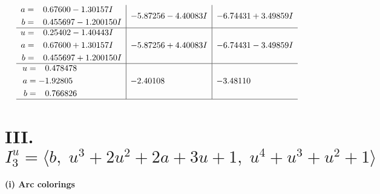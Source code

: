 \documentclass[1p]{elsarticle_modified}
\theoremstyle{definition}
\begin{document}
$$\begin{array}{c|c|c}
\begin{aligned}
a &= \phantom{-}0.67600 - 1.30157 I \\
b &= \phantom{-}0.455697 - 1.200150 I\end{aligned}
 & -5.87256 - 4.40083 I & -6.74431 + 3.49859 I \\ \hline\begin{aligned}
u &= \phantom{-}0.25402 - 1.40443 I \\
a &= \phantom{-}0.67600 + 1.30157 I \\
b &= \phantom{-}0.455697 + 1.200150 I\end{aligned}
 & -5.87256 + 4.40083 I & -6.74431 - 3.49859 I \\ \hline\begin{aligned}
u &= \phantom{-}0.478478\phantom{ +0.000000I} \\
a &= -1.92805\phantom{ +0.000000I} \\
b &= \phantom{-}0.766826\phantom{ +0.000000I}\end{aligned}
 & -2.40108\phantom{ +0.000000I} & -3.48110\phantom{ +0.000000I}\\
 \hline 
 \end{array}$$\newpage\newpage\renewcommand{\arraystretch}{1}
\centering \section*{III. $I^u_{3}= \langle b,\;u^3+2 u^2+2 a+3 u+1,\;u^4+u^3+u^2+1 \rangle$}
\flushleft \textbf{(i) Arc colorings}\\
\end{document}
